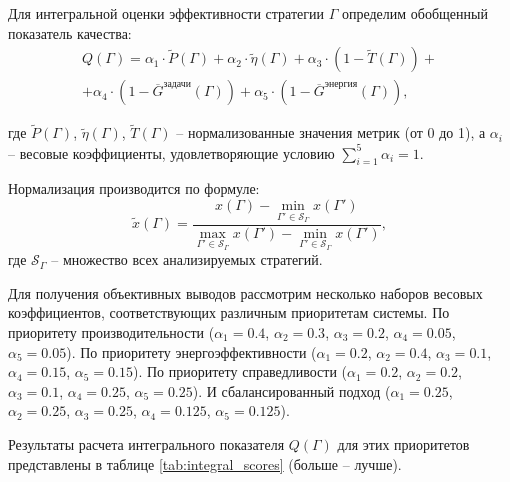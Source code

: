 Для интегральной оценки эффективности стратегии $\Gamma$ определим обобщенный показатель качества:
\begin{equation}
	\begin{split}
		Q(\Gamma) = \alpha_1 \cdot \tilde{P}(\Gamma) + \alpha_2 \cdot \tilde{\eta}(\Gamma) + \alpha_3 \cdot (1 - \tilde{T}(\Gamma)) + \\
		+ \alpha_4 \cdot (1 - \overline{G}^{\text{задачи}}(\Gamma)) + \alpha_5 \cdot (1 - \overline{G}^{\text{энергия}}(\Gamma)),
	\end{split}
\end{equation}

где $\tilde{P}(\Gamma)$, $\tilde{\eta}(\Gamma)$, $\tilde{T}(\Gamma)$ -- нормализованные значения метрик (от 0 до 1), а $\alpha_i$ -- весовые коэффициенты, удовлетворяющие условию $\sum_{i=1}^{5} \alpha_i = 1$.

Нормализация производится по формуле:
\begin{equation}
	\tilde{x}(\Gamma) = \frac{x(\Gamma) - \min\limits_{\Gamma' \in \mathcal{S}_\Gamma} x(\Gamma')}{\max\limits_{\Gamma' \in \mathcal{S}_\Gamma} x(\Gamma') - \min\limits_{\Gamma' \in \mathcal{S}_\Gamma} x(\Gamma')},
\end{equation}
где $\mathcal{S}_\Gamma$ -- множество всех анализируемых стратегий.

Для получения объективных выводов рассмотрим несколько наборов весовых коэффициентов, соответствующих различным приоритетам системы. По приоритету производительности ($\alpha_1 = 0.4$, $\alpha_2 = 0.3$, $\alpha_3 = 0.2$, $\alpha_4 = 0.05$, $\alpha_5 = 0.05$). По
приоритету энергоэффективности ($\alpha_1 = 0.2$, $\alpha_2 = 0.4$, $\alpha_3 = 0.1$, $\alpha_4 = 0.15$, $\alpha_5 = 0.15$). По приоритету справедливости ($\alpha_1 = 0.2$, $\alpha_2 = 0.2$, $\alpha_3 = 0.1$, $\alpha_4 = 0.25$, $\alpha_5 = 0.25$). И сбалансированный подход ($\alpha_1 = 0.25$, $\alpha_2 = 0.25$, $\alpha_3 = 0.25$, $\alpha_4 = 0.125$, $\alpha_5 = 0.125$).

Результаты расчета интегрального показателя $Q(\Gamma)$ для этих приоритетов представлены в таблице \ref{tab:integral_scores} (больше -- лучше).

\begin{table}[h!]
	\centering
	\caption{Интегральные оценки эффективности стратегий}
	\label{tab:integral_scores}
\end{table}

